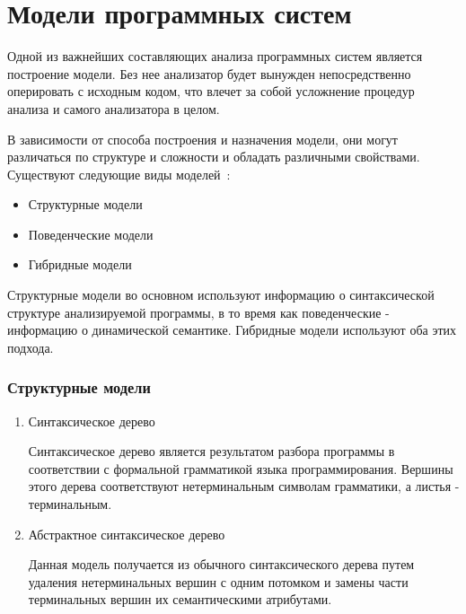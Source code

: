 \section{Модели программных систем}
\label{sec:system_models}

Одной из важнейших составляющих анализа программных систем является построение
модели. Без нее анализатор будет вынужден непосредственно оперировать с исходным
кодом, что влечет за собой усложнение процедур анализа и самого анализатора в
целом.

В зависимости от способа построения и назначения модели, они могут различаться
по структуре и сложности и обладать различными свойствами. Существуют следующие
виды моделей~\cite{itsykson}:

\begin{itemize}
    \item Структурные модели
    \item Поведенческие модели
    \item Гибридные модели
\end{itemize}

Структурные модели во основном используют информацию о синтаксической структуре
анализируемой программы, в то время как поведенческие - информацию о
динамической семантике. Гибридные модели используют оба этих подхода.

\subsubsection{Структурные модели}
\begin{enumerate}
    \item Синтаксическое дерево

    Синтаксическое дерево является результатом разбора программы в
    соответствии с формальной грамматикой языка программирования. Вершины
    этого дерева соответствуют нетерминальным символам грамматики, а листья
    - терминальным.

    \item Абстрактное синтаксическое дерево

    Данная модель получается из обычного синтаксического дерева путем
    удаления нетерминальных вершин с одним потомком и замены части
    терминальных вершин их семантическими атрибутами.
\end{enumerate}

